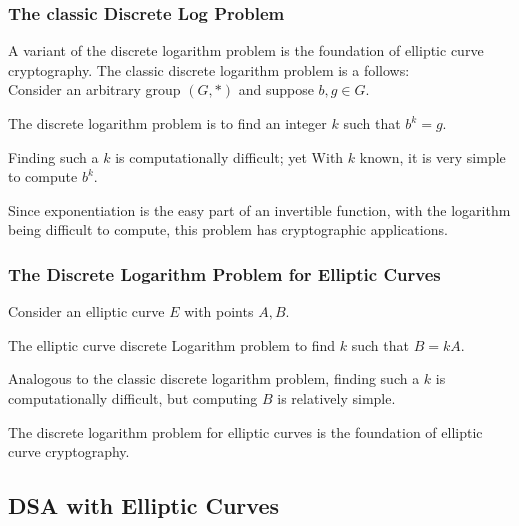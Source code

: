 \subsubsection{The classic Discrete Log Problem}
A variant of the discrete logarithm problem is the foundation of elliptic
curve cryptography.  The classic discrete logarithm problem is a follows:\\

Consider an arbitrary group $(G, *)$ and suppose $b,g \in G$.

The discrete logarithm problem is to find an integer $k$
such that $b^k = g$.

Finding such a $k$ is computationally difficult; yet
With $k$ known, it is very simple to compute $b^k$.

Since exponentiation is the easy part of an invertible function, with
the logarithm being difficult to compute, this problem has cryptographic
applications.


\subsubsection{The Discrete Logarithm Problem for Elliptic Curves}

Consider an elliptic curve $E$ with points $A,B$.

The elliptic curve discrete Logarithm problem to find $k$
such that $B = kA$.

Analogous to the classic discrete logarithm problem, finding such a $k$
is computationally difficult, but computing $B$ is relatively simple.

The discrete logarithm problem for elliptic curves is the foundation of
elliptic curve cryptography.

\subsection{DSA with Elliptic Curves}

